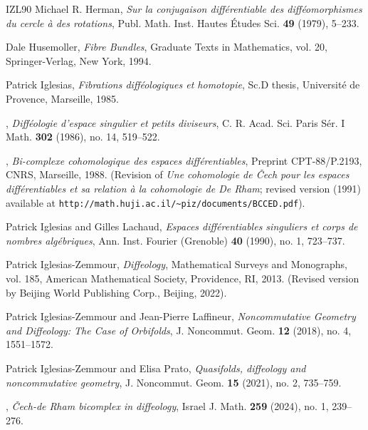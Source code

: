 \documentclass[10pt,letterpaper,reqno]{amsart}
\theoremstyle{article}
\newcommand{\1}{{\hat 1}}
\newcommand{\0}{{\hat 0}}
\begin{document}
\begin{thebibliography}{IZL90}
    Michael R. Herman, %
    \emph{Sur la conjugaison différentiable des difféomorphismes du cercle à des rotations},
    Publ. Math. Inst. Hautes Études Sci. \textbf{49} (1979), 5--233.
    
    Dale Husemoller,
    \emph{Fibre Bundles},
    Graduate Texts in Mathematics, vol. 20, Springer-Verlag, New York, 1994.

    Patrick Iglesias,
    \emph{Fibrations difféologiques et homotopie},
    Sc.D thesis, Universit{\'e} de Provence, Marseille, 1985.
    
    \bysame,
    \emph{Diff{\'e}ologie d'espace singulier et petits diviseurs},
    C. R. Acad. Sci. Paris Sér. I Math. \textbf{302} (1986), no. 14, 519--522.
    
    \bysame,
    \emph{Bi-complexe cohomologique des espaces diff\'erentiables},
    Preprint CPT-88/P.2193, CNRS, Marseille, 1988. (Revision of \emph{Une cohomologie de \v{C}ech pour les espaces diff\'erentiables et sa relation à la cohomologie de De Rham}; revised version (1991) available at \texttt{http://math.huji.ac.il/{\textasciitilde}piz/documents/BCCED.pdf}).
    
    Patrick Iglesias and Gilles Lachaud,
    \emph{Espaces différentiables singuliers et corps de nombres algébriques},
    Ann. Inst. Fourier (Grenoble) \textbf{40} (1990), no. 1, 723--737.
    
    Patrick Iglesias-Zemmour,
    \emph{Diffeology},
    Mathematical Surveys and Monographs, vol. 185, American Mathematical Society, Providence, RI, 2013. (Revised version by Beijing World Publishing Corp., Beijing, 2022).
    
    Patrick Iglesias-Zemmour and Jean-Pierre Laffineur,
    \emph{Noncommutative Geometry and Diffeology: The Case of Orbifolds},
    J. Noncommut. Geom. \textbf{12} (2018), no. 4, 1551--1572.
    
    Patrick Iglesias-Zemmour and Elisa Prato,
    \emph{Quasifolds, diffeology and noncommutative geometry},
    J. Noncommut. Geom. \textbf{15} (2021), no. 2, 735--759.
    
    \bysame,
    \emph{{\v C}ech-de Rham bicomplex in diffeology},
    Israel J. Math. \textbf{259} (2024), no. 1, 239--276.
    

\end{thebibliography}
\end{document}
